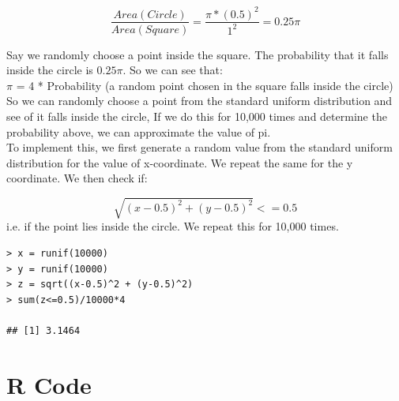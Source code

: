 \documentclass[12pt,letterpaper,titlepage,en-US]{article}
\begin{document}
\begin{equation}
\dfrac{Area(Circle)}{Area(Square)} =\dfrac{ \pi* (0.5)^{2}}{ 1^{2}} = 0.25\pi
\end{equation}


Say we randomly choose a point inside the square. The probability that it falls inside the circle is $0.25\pi$. So we can see that:\\

$\pi$ = 4 * Probability (a random point chosen in the square falls inside the circle)\\

So we can randomly choose a point from the standard uniform distribution and see of it falls inside the circle, If we do this for 10,000 times and determine the probability above, we can approximate the value of pi.\\

To implement this, we first generate a random value from the standard uniform distribution for the value of x-coordinate. We repeat the same for the y coordinate. We then check if:

\begin{equation}
\sqrt{(x-0.5)^{2} + (y-0.5)^{2} }<= 0.5
\end{equation}  i.e. if the point lies inside the circle. We repeat this for 10,000 times. 

\begin{knitrout}
\color{fgcolor}
\begin{kframe}

\begin{verbatim}
> x = runif(10000)
> y = runif(10000)
> z = sqrt((x-0.5)^2 + (y-0.5)^2)
> sum(z<=0.5)/10000*4

## [1] 3.1464
\end{verbatim}
\end{kframe}
\end{knitrout}


\section{R Code}



\end{document}
